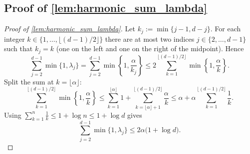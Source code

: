 \documentclass{article}
\theoremstyle{plain}
\theoremstyle{definition}
\theoremstyle{plain}
\begin{document}
\subsection{Proof of \texorpdfstring{\cref{lem:harmonic_sum_lambda}}{Lemma (A harmonic bound for the Laplace widths)}}
\label{proof:lem:harmonic_sum_lambda}
\begin{proof}[Proof of \cref{lem:harmonic_sum_lambda}]
    Let $k_j:=\min\{j-1,d-j\}$.
    For each integer $k\in\{1,\ldots,\lfloor(d-1)/2\rfloor\}$ there are at most two indices $j\in\{2,\ldots,d-1\}$
    such that $k_j=k$ (one on the left and one on the right of the midpoint).
    Hence
    \[
        \sum_{j=2}^{d-1}\min\{1,\lambda_j\}
        =
        \sum_{j=2}^{d-1}\min\left\{1,\frac{\alpha}{k_j}\right\}
        \le
        2\sum_{k=1}^{\lfloor(d-1)/2\rfloor}\min\left\{1,\frac{\alpha}{k}\right\}.
    \]
    Split the sum at $k=\lfloor \alpha \rfloor$:
    \[
        \sum_{k=1}^{\lfloor(d-1)/2\rfloor}\min\left\{1,\frac{\alpha}{k}\right\}
        \le
        \sum_{k=1}^{\lfloor\alpha\rfloor} 1
        +
        \sum_{k=\lfloor\alpha\rfloor+1}^{\lfloor(d-1)/2\rfloor}\frac{\alpha}{k}
        \le
        \alpha + \alpha\sum_{k=1}^{\lfloor(d-1)/2\rfloor}\frac{1}{k}.
    \]
    Using $\sum_{k=1}^n \frac1k \le 1+\log n \le 1+\log d$ gives
    \[
        \sum_{j=2}^{d-1}\min\{1,\lambda_j\}
        \le
        2\alpha\bigl(1+\log d\bigr).
    \]
\end{proof}
\end{document}
